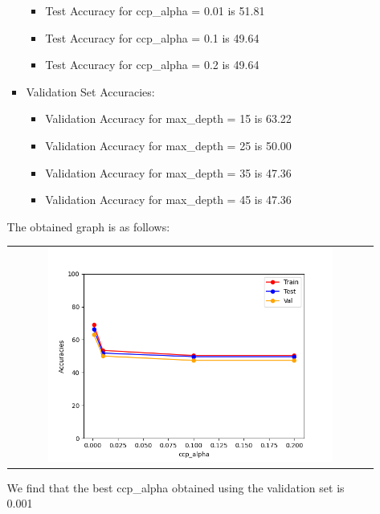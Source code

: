 \begin{enumerate}[label=(\alph*)]
\begin{enumerate}[label=\roman*.]
\begin{itemize}
\begin{itemize}
                                  \item Test Accuracy for ccp\_alpha = 0.01 is 51.81
                                  \item Test Accuracy for ccp\_alpha = 0.1 is 49.64
                                  \item Test Accuracy for ccp\_alpha = 0.2 is 49.64
                              \end{itemize}
                        \item Validation Set Accuracies:
                              \begin{itemize}
                                  \item Validation Accuracy for max\_depth = 15 is 63.22
                                  \item Validation Accuracy for max\_depth = 25 is 50.00
                                  \item Validation Accuracy for max\_depth = 35 is 47.36
                                  \item Validation Accuracy for max\_depth = 45 is 47.36
                              \end{itemize}
                    \end{itemize}
                    \newpage
                    The obtained graph is as follows:
                    \begin{center}
                        \begin{tabular}{c}
                            \includegraphics[width=0.8\textwidth]{./images/q1_part_d_pruning.png}
                        \end{tabular}
                    \end{center}
                    We find that the best ccp\_alpha obtained using the validation set is 0.001

\end{enumerate}
\end{enumerate}
